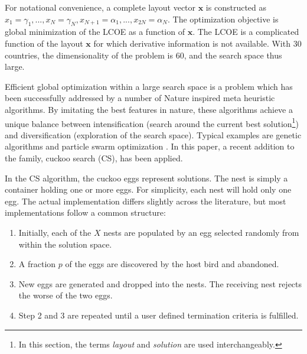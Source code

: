 \documentclass[a4paper, 5p, sort&compress]{elsarticle}%
\begin{document}
For notational convenience, a complete layout vector $\boldsymbol x$
is constructed as
$x_{1} = \gamma_{1}, ..., x_{N} =\gamma_{N}, x_{N+1} = \alpha_{1}, ...,
x_{2N} = \alpha_{N}$.
The optimization objective is global minimization of the LCOE as a
function of $\boldsymbol x$. The LCOE is a complicated function of the
layout $\boldsymbol x$ for which derivative information is not
available. With 30 countries, the dimensionality of the problem is 60,
and the search space thus large.

Efficient global optimization within a large search space is a problem
which has been successfully addressed by a number of Nature inspired
meta heuristic algorithms. By imitating the best features in nature,
these algorithms achieve a unique balance between intensification
(search around the current best
solution\footnote{In this section, the terms \textit{layout} and
  \textit{solution} are used interchangeably.})
and diversification (exploration of the search space). Typical
examples are genetic algorithms \cite{Goldberg1989} and particle swarm
optimization \cite{Kennedy95}. In this paper, a recent addition
\cite{YangDeb} to the family, cuckoo search (CS), has been applied.

In the CS algorithm, the cuckoo eggs represent solutions. The nest is
simply a container holding one or more eggs. For simplicity, each nest
will hold only one egg. The actual implementation differs slightly
across the literature\cite{YangDeb,Walton,Tuba}, but most
implementations follow a common structure:

\begin{enumerate}
\item Initially, each of the $X$
  nests are populated by an egg selected randomly from within the
  solution space.
\item A fraction $p$ of the eggs are discovered by the host bird and
  abandoned.
\item New eggs are generated and dropped into the nests. The receiving
  nest rejects the worse of the two eggs.
\item Step 2 and 3 are repeated until a user defined termination
  criteria is fulfilled.
\end{enumerate}
\end{document}
